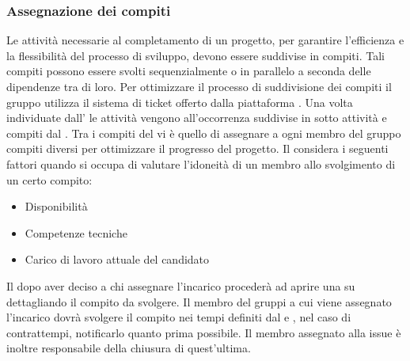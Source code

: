 \subsubsection{Assegnazione dei compiti}
Le attività necessarie al completamento di un progetto, per garantire l'efficienza e la flessibilità del processo di sviluppo, devono essere suddivise in compiti. Tali compiti possono essere svolti sequenzialmente o in parallelo a seconda delle dipendenze tra di loro. Per ottimizzare il processo di suddivisione dei compiti il gruppo utilizza il sistema di ticket offerto dalla piattaforma .
Una volta individuate dall' \ana{} le attività vengono all'occorrenza suddivise in sotto attività e compiti dal \RdP{}. Tra i compiti del \RdP{} vi è quello di assegnare a ogni membro del gruppo compiti diversi per ottimizzare il progresso del progetto. Il \RdP{} considera i seguenti fattori quando si occupa di valutare l'idoneità di un membro allo svolgimento di un certo compito:
\begin{itemize}
\item Disponibilità
\item Competenze tecniche
\item Carico di lavoro attuale del candidato
\end{itemize}
Il \RdP{} dopo aver deciso a chi assegnare l'incarico procederà ad aprire una  su  dettagliando il compito da svolgere.
Il membro del gruppi a cui viene assegnato l'incarico dovrà svolgere il compito nei tempi definiti dal \RdP{} e , nel caso di contrattempi, notificarlo quanto prima possibile. Il membro assegnato alla issue è inoltre responsabile della chiusura di quest'ultima.